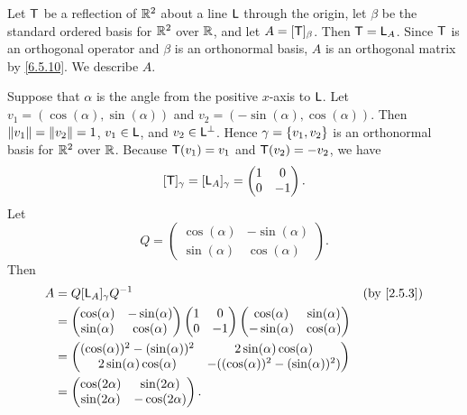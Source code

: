 \begin{eg}\label{6.5.12}
  Let \(\mathsf{T}\) be a reflection of \(\mathbb{R}^2\) about a line \(\mathsf{L}\) through the origin, let \(\beta\) be the standard ordered basis for \(\mathbb{R}^2\) over \(\mathbb{R}\), and let \(A = [\mathsf{T}]_{\beta}\).
  Then \(\mathsf{T} = \mathsf{L}_A\).
  Since \(\mathsf{T}\) is an orthogonal operator and \(\beta\) is an orthonormal basis, \(A\) is an orthogonal matrix by \cref{6.5.10}.
  We describe \(A\).

  Suppose that \(\alpha\) is the angle from the positive \(x\)-axis to \(\mathsf{L}\).
  Let \(v_1 = (\cos(\alpha), \sin(\alpha))\) and \(v_2 = (-\sin(\alpha), \cos(\alpha))\).
  Then \(\left\lVert v_1\right\rVert = \left\lVert v_2\right\rVert = 1\), \(v_1 \in \mathsf{L}\), and \(v_2 \in \mathsf{L}^{\perp}\).
  Hence \(\gamma = \left\lbrace v_1, v_2\right\rbrace\) is an orthonormal basis for \(\mathbb{R}^2\) over \(\mathbb{R}\).
  Because \(\mathsf{T}(v_1) = v_1\) and \(\mathsf{T}(v_2) = -v_2\), we have
  \[
    [\mathsf{T}]_{\gamma} = [\mathsf{L}_A]_{\gamma} = \begin{pmatrix}
      1 & 0  \\
      0 & -1
    \end{pmatrix}.
  \]
  Let
  \[
    Q = \begin{pmatrix}
      \cos(\alpha) & -\sin(\alpha) \\
      \sin(\alpha) & \cos(\alpha)
    \end{pmatrix}.
  \]
  Then
  \begin{align*}
    A & = Q [\L_A]_{\gamma} Q^{-1}                                                      &  & \by{2.5.3} \\
      & = \begin{pmatrix}
            \cos(\alpha) & -\sin(\alpha) \\
            \sin(\alpha) & \cos(\alpha)
          \end{pmatrix} \begin{pmatrix}
                          1 & 0  \\
                          0 & -1
                        \end{pmatrix} \begin{pmatrix}
                                        \cos(\alpha)  & \sin(\alpha) \\
                                        -\sin(\alpha) & \cos(\alpha)
                                      \end{pmatrix}                                      \\
      & = \begin{pmatrix}
            (\cos(\alpha))^2 - (\sin(\alpha))^2 & 2 \sin(\alpha) \cos(\alpha)            \\
            2 \sin(\alpha) \cos(\alpha)         & -((\cos(\alpha))^2 - (\sin(\alpha))^2)
          \end{pmatrix}                  \\
      & = \begin{pmatrix}
            \cos(2 \alpha) & \sin(2 \alpha)  \\
            \sin(2 \alpha) & -\cos(2 \alpha)
          \end{pmatrix}.
  \end{align*}
\end{eg}

